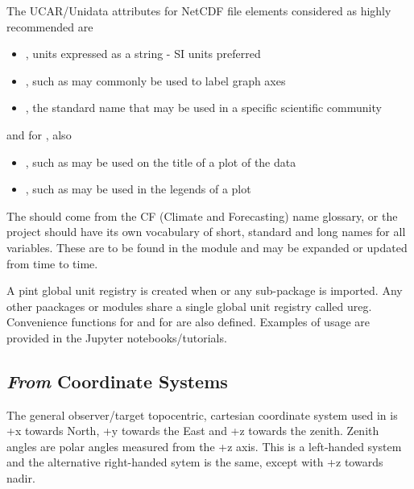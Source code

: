 \documentclass[a4paper,10pt,english]{sphinxmanual}
\begin{document}
The UCAR/Unidata attributes for NetCDF file elements considered as highly recommended are
\begin{itemize}
\item {} 
, units expressed as a string - SI units preferred

\item {} 
, such as may commonly be used to label graph axes

\item {} 
, the standard name that may be used in a specific scientific community

\end{itemize}

and for , also
\begin{itemize}
\item {} 
, such as may be used on the title of a plot of the data

\item {} 
, such as may be used in the legends of a plot

\end{itemize}

The  should come from the CF (Climate and Forecasting) name glossary, or the project should have
its own vocabulary of short, standard and long names for all variables. These are to be found in the
 module and may be expanded or updated from time to time.

A pint global unit registry is created when  or any sub-package is imported. Any other  paackages
or modules share a single global unit registry called ureg. Convenience functions  for  and  for
 are also defined. Examples of usage are provided in the Jupyter notebooks/tutorials.


\subsection{\emph{From} Coordinate Systems}
\label{styleguide:from-coordinate-systems}
The general observer/target topocentric, cartesian coordinate system used in  is +x towards North, +y towards
the East and +z towards the zenith. Zenith angles are polar angles measured from the +z axis. This is a left-handed
system and the alternative right-handed sytem is the same, except with +z towards nadir.
\end{document}
